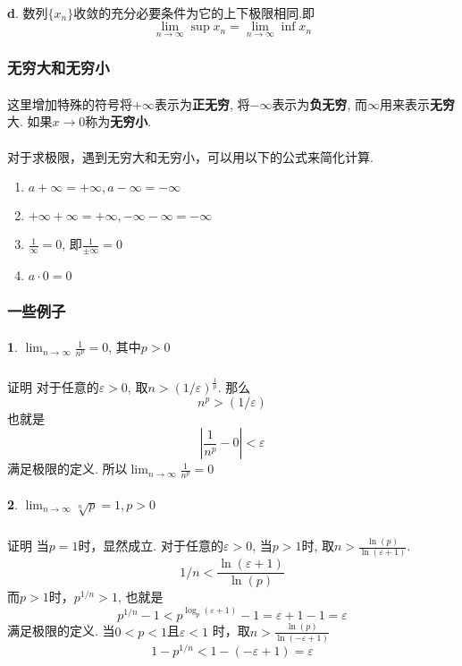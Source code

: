\paragraph{}
\textbf{d}. 数列$\{x_n\}$收敛的充分必要条件为它的上下极限相同.即
$$
\lim_{n\to \infty} \sup{x_n} = \lim_{n\to \infty} \inf{x_n}
$$

\subsubsection{无穷大和无穷小}
\paragraph{}
这里增加特殊的符号将$+\infty$表示为\textbf{正无穷}, 将$-\infty$表示为\textbf{负无穷}, 而$\infty$用来表示\textbf{无穷}大.  如果$x \to 0$称为\textbf{无穷小}.

\paragraph{}
对于求极限，遇到无穷大和无穷小，可以用以下的公式来简化计算.
\begin{enumerate}
\item $a + \infty = +\infty, a - \infty = -\infty$
\item $+ \infty + \infty = +\infty,  - \infty - \infty = -\infty$
\item $\frac{1}{\infty} = 0$, 即$\frac{1}{\pm \infty} = 0$
\item $a \cdot 0 = 0$
\end{enumerate}

\subsubsection{一些例子}
\paragraph{}
\textbf{1}. $\lim_{n\to \infty} \frac{1}{n^p} = 0$, 其中$p > 0$
\subparagraph{}
证明\: 对于任意的$\varepsilon > 0$, 取$n > (1/\varepsilon)^{\frac{1}{p}}$. 那么
$$
n^p > (1/\varepsilon)
$$
也就是
$$
|\frac{1}{n^p} - 0|< \varepsilon
$$
满足极限的定义. 所以$\lim_{n\to \infty} \frac{1}{n^p} = 0$

\paragraph{}
\textbf{2}. $\lim_{n\to \infty} \sqrt[n]{p} = 1, p > 0$
\subparagraph{}
证明\: 当$p = 1$时，显然成立. 对于任意的$\varepsilon > 0$, 当$p > 1$时, 取$n > \frac{\ln (p) }{\ln (\varepsilon + 1)}$.
$$
1/n < \frac{\ln (\varepsilon + 1) }{\ln (p)}
$$
而$p > 1$时，$p^{1/n} > 1$, 也就是
$$
p^{1/n} - 1 < p^{\log_p(\varepsilon + 1)} - 1 = \varepsilon + 1 - 1 = \varepsilon
$$
满足极限的定义. 当$0 < p < 1$且$\varepsilon < 1$ 时，取$n > \frac{\ln (p) }{\ln (-\varepsilon + 1)}$
$$
1 - p^{1/n} < 1 - (-\varepsilon + 1) = \varepsilon
$$

